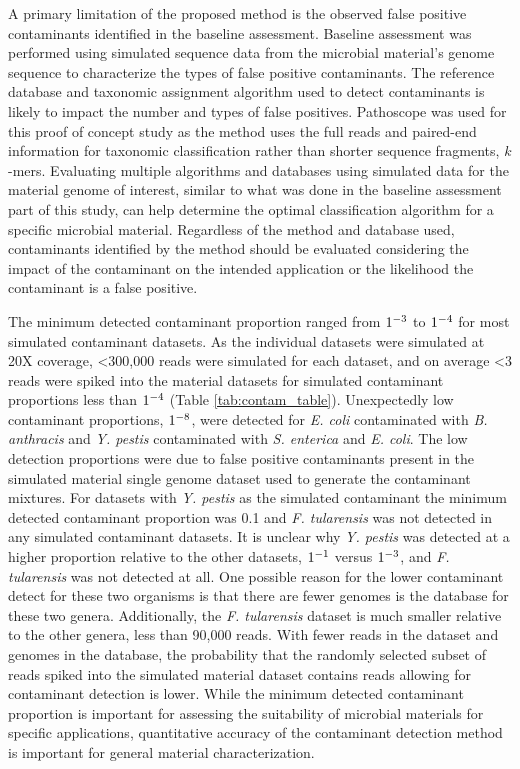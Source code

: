 \documentclass[fleqn,10pt,lineno]{wlpeerj}\usepackage[]{graphicx}\usepackage[]{color}
\begin{document}
A primary limitation of the proposed method is the observed false positive contaminants identified in the baseline assessment.
Baseline assessment was performed using simulated sequence data from the microbial material's genome sequence to characterize the types of false positive contaminants.
The reference database and taxonomic assignment algorithm used to detect contaminants is likely to impact the number and types of false positives.
Pathoscope was used for this proof of concept study as the method uses the full reads and paired-end information for taxonomic classification rather than shorter sequence fragments, $k$-mers.
Evaluating multiple algorithms and databases using simulated data for the material genome of interest,
similar to what was done in the baseline assessment part of this study,
can help determine the optimal classification algorithm for a specific microbial material.
Regardless of the method and database used, contaminants identified by the method should be evaluated considering the impact of the contaminant on the intended application or the likelihood the contaminant is a false positive.

The minimum detected contaminant proportion ranged from $1 \time 10^{-3}$ to $1 \time 10^{-4}$ for most simulated contaminant datasets.
As the individual datasets were simulated at 20X coverage, \textless 300,000 reads were simulated for each dataset, and on average \textless 3 reads were spiked into the material datasets for simulated contaminant proportions less than $1 \time 10^{-4}$ (Table \ref{tab:contam_table}).
Unexpectedly low contaminant proportions, $1 \time 10^{-8}$, were detected for \textit{E. coli} contaminated with \textit{B. anthracis} and \textit{Y. pestis} contaminated with \textit{S. enterica} and \textit{E. coli}.
The low detection proportions were due to false positive contaminants present in the simulated material single genome dataset used to generate the contaminant mixtures.
For datasets with \textit{Y. pestis} as the simulated contaminant the minimum detected contaminant proportion was 0.1 and \textit{F. tularensis} was not detected in any simulated contaminant datasets.
It is unclear why \textit{Y. pestis} was detected at a higher proportion relative to the other datasets, $1 \time 10^{-1}$ versus $1 \time 10^{-3}$, and \textit{F. tularensis} was not detected at all.
One possible reason for the lower contaminant detect for these two organisms is that there are fewer genomes is the database for these two genera.
Additionally, the \textit{F. tularensis} dataset is much smaller relative to the other genera, less than 90,000 reads.
With fewer reads in the dataset and genomes in the database, the probability that the randomly selected subset of reads spiked into the simulated material dataset contains reads allowing for contaminant detection is lower.
While the minimum detected contaminant proportion is important for assessing the suitability of microbial materials for specific applications, quantitative accuracy of the contaminant detection method is important for general material characterization.
\end{document}
